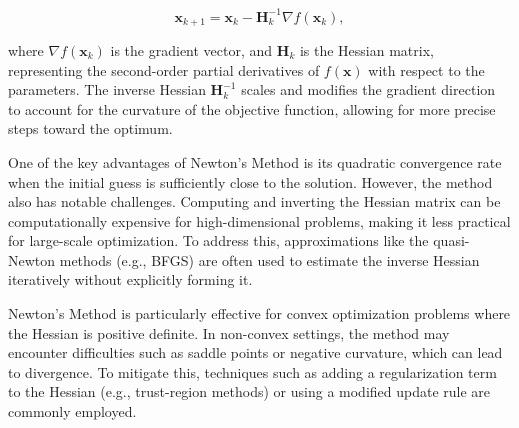 \begin{equation}
\mathbf{x}_{k+1} = \mathbf{x}_k - \mathbf{H}_k^{-1} \nabla f(\mathbf{x}_k),
\end{equation}

\noindent where $\nabla f(\mathbf{x}_k)$ is the gradient vector, and $\mathbf{H}_k$ is the Hessian matrix, representing the second-order partial derivatives of $f(\mathbf{x})$ with respect to the parameters. The inverse Hessian $\mathbf{H}_k^{-1}$ scales and modifies the gradient direction to account for the curvature of the objective function, allowing for more precise steps toward the optimum.

One of the key advantages of Newton's Method is its quadratic convergence rate when the initial guess is sufficiently close to the solution. However, the method also has notable challenges. Computing and inverting the Hessian matrix can be computationally expensive for high-dimensional problems, making it less practical for large-scale optimization. To address this, approximations like the quasi-Newton methods (e.g., BFGS) are often used to estimate the inverse Hessian iteratively without explicitly forming it.

Newton's Method is particularly effective for convex optimization problems where the Hessian is positive definite. In non-convex settings, the method may encounter difficulties such as saddle points or negative curvature, which can lead to divergence. To mitigate this, techniques such as adding a regularization term to the Hessian (e.g., trust-region methods) or using a modified update rule are commonly employed.







